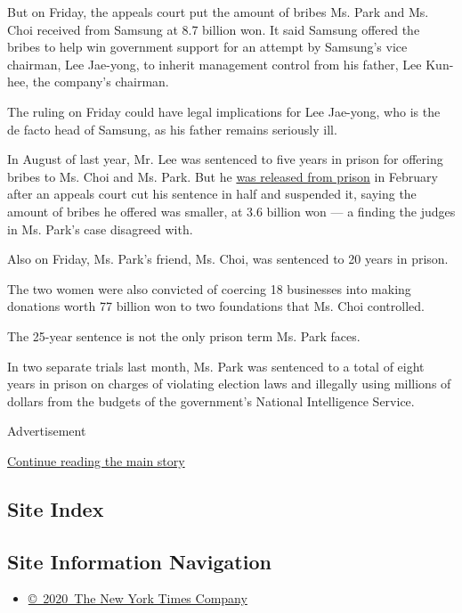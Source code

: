 But on Friday, the appeals court put the amount of bribes Ms. Park and
Ms. Choi received from Samsung at 8.7 billion won. It said Samsung
offered the bribes to help win government support for an attempt by
Samsung's vice chairman, Lee Jae-yong, to inherit management control
from his father, Lee Kun-hee, the company's chairman.

The ruling on Friday could have legal implications for Lee Jae-yong, who
is the de facto head of Samsung, as his father remains seriously ill.

In August of last year, Mr. Lee was sentenced to five years in prison
for offering bribes to Ms. Choi and Ms. Park. But he
\href{https://www.nytimes3xbfgragh.onion/2018/02/05/business/samsung-lee-jae-yong-appeal.html}{was
released from prison} in February after an appeals court cut his
sentence in half and suspended it, saying the amount of bribes he
offered was smaller, at 3.6 billion won --- a finding the judges in Ms.
Park's case disagreed with.

Also on Friday, Ms. Park's friend, Ms. Choi, was sentenced to 20 years
in prison.

The two women were also convicted of coercing 18 businesses into making
donations worth 77 billion won to two foundations that Ms. Choi
controlled.

The 25-year sentence is not the only prison term Ms. Park faces.

In two separate trials last month, Ms. Park was sentenced to a total of
eight years in prison on charges of violating election laws and
illegally using millions of dollars from the budgets of the government's
National Intelligence Service.

Advertisement

\protect\hyperlink{after-bottom}{Continue reading the main story}

\hypertarget{site-index}{%
\subsection{Site Index}\label{site-index}}

\hypertarget{site-information-navigation}{%
\subsection{Site Information
Navigation}\label{site-information-navigation}}

\begin{itemize}
\tightlist
\item
  \href{https://help.nytimes3xbfgragh.onion/hc/en-us/articles/115014792127-Copyright-notice}{©~2020~The
  New York Times Company}
\end{itemize}

